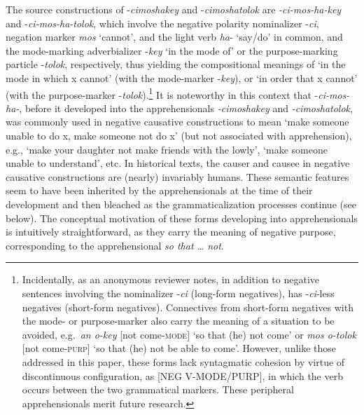 \documentclass[output=paper,colorlinks,citecolor=brown]{langscibook}
\begin{document}
The source constructions of \nobreakdash-\textit{cimoshakey} and \nobreakdash-\textit{cimoshatolok} are \textit{-ci-mos-ha-key} and \nobreakdash-\textit{ci-mos-ha-tolok}, which involve the negative polarity nominalizer \nobreakdash-\textit{ci}, negation marker \textit{mos} `cannot', and the light verb \textit{ha}- `say/do' in common, and the mode-marking adverbializer \nobreakdash-\textit{key} `in the mode of' or the purpose-marking particle \nobreakdash-\textit{tolok}, respectively, thus yielding the compositional meanings of `in the mode in which x cannot' (with the mode-marker \nobreakdash-\textit{key}), or `in order that x cannot' (with the purpose-marker \nobreakdash-\textit{tolok}).\footnote{Incidentally, as an anonymous reviewer notes, in addition to negative sentences involving the nominalizer \nobreakdash-\textit{ci} (long-form negatives),  has \nobreakdash-\textit{ci}-less negatives (short-form negatives). Connectives from short-form negatives with the mode- or purpose-marker also carry the meaning of a situation to be avoided, e.g.\  \textit{an o-key} [not come-\textsc{mode}] `so that (he) not come' or \textit{mos o-tolok} [not come-\textsc{purp}] `so that (he) not be able to come'. However, unlike those addressed in this paper, these forms lack syntagmatic cohesion by virtue of discontinuous configuration, as [NEG V-MODE/PURP], in which the verb occurs between the two grammatical markers. These peripheral apprehensionals merit future research.} It is noteworthy in this context that  \nobreakdash-\textit{ci-mos-ha-}, before it developed into the apprehensionals \textit{-cimoshakey} and \textit{-cimoshatolok}, was commonly used in negative causative constructions to mean `make someone unable to do x, make someone not do x' (but not associated with apprehension), e.g., `make your daughter not make friends with the lowly', `make someone unable to understand', etc. In historical texts, the causer and causee in negative causative constructions are (nearly) invariably humans. These semantic features seem to have been inherited by the apprehensionals at the time of their development and then bleached as the grammaticalization processes continue (see  below). The conceptual motivation of these forms developing into apprehensionals is intuitively straightforward, as they carry the meaning of negative purpose, corresponding to the  apprehensional \textit{so that  … not}.
\end{document}
